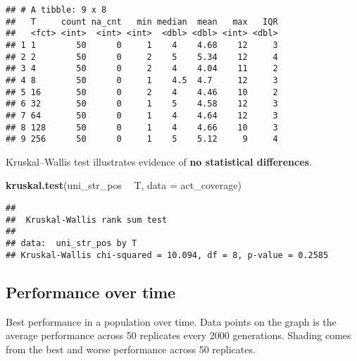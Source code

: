 \documentclass[]{book}
\newenvironment{Shaded}{\begin{snugshade}}{\end{snugshade}}
\newcommand{\DataTypeTok}[1]{\textcolor[rgb]{0.13,0.29,0.53}{#1}}
\newcommand{\KeywordTok}[1]{\textcolor[rgb]{0.13,0.29,0.53}{\textbf{#1}}}
\newcommand{\NormalTok}[1]{#1}
\newcommand{\OperatorTok}[1]{\textcolor[rgb]{0.81,0.36,0.00}{\textbf{#1}}}
\newcommand{\StringTok}[1]{\textcolor[rgb]{0.31,0.60,0.02}{#1}}
\begin{document}
\begin{verbatim}
## # A tibble: 9 x 8
##   T     count na_cnt   min median  mean   max   IQR
##   <fct> <int>  <int> <int>  <dbl> <dbl> <int> <dbl>
## 1 1        50      0     1    4    4.68    12     3
## 2 2        50      0     2    5    5.34    12     4
## 3 4        50      0     2    4    4.04    11     2
## 4 8        50      0     1    4.5  4.7     12     3
## 5 16       50      0     2    4    4.46    10     2
## 6 32       50      0     1    5    4.58    12     3
## 7 64       50      0     1    4    4.64    12     3
## 8 128      50      0     1    4    4.66    10     3
## 9 256      50      0     1    5    5.12     9     4
\end{verbatim}

Kruskal--Wallis test illustrates evidence of \textbf{no statistical differences}.

\begin{Shaded}
\begin{Highlighting}[]
\KeywordTok{kruskal.test}\NormalTok{(uni_str_pos }\OperatorTok{~}\StringTok{ }\NormalTok{T, }\DataTypeTok{data =}\NormalTok{ act_coverage)}
\end{Highlighting}
\end{Shaded}

\begin{verbatim}
## 
##  Kruskal-Wallis rank sum test
## 
## data:  uni_str_pos by T
## Kruskal-Wallis chi-squared = 10.094, df = 8, p-value = 0.2585
\end{verbatim}

\hypertarget{performance-over-time-2}{%
\subsection{Performance over time}\label{performance-over-time-2}}

Best performance in a population over time.
Data points on the graph is the average performance across 50 replicates every 2000 generations.
Shading comes from the best and worse performance across 50 replicates.

\begin{Shaded}
\end{Shaded}
\end{document}
